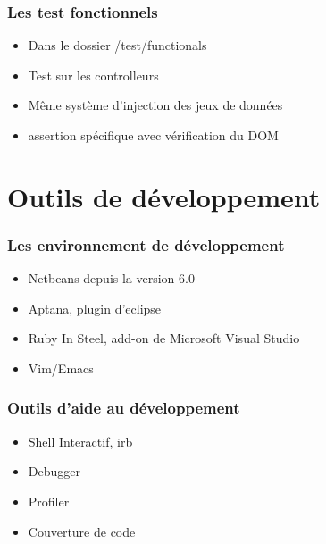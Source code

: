 \documentclass{beamer}
\begin{document}
\begin{frame}
    \frametitle{Les test fonctionnels}
    \begin{itemize}
        \item Dans le dossier /test/functionals
        \item Test sur les controlleurs
        \item Même système d'injection des jeux de données
        \item assertion spécifique avec vérification du DOM
    \end{itemize}
\end{frame}

\section{Outils de développement}

\begin{frame}
    \frametitle{Les environnement de développement}
    \begin{itemize}
        \item Netbeans depuis la version 6.0 
        \item Aptana, plugin d'eclipse
        \item Ruby In Steel, add-on de Microsoft Visual Studio
        \item Vim/Emacs
    \end{itemize}
\end{frame}

\begin{frame}
    \frametitle{Outils d'aide au développement}
    \begin{itemize}
        \item Shell Interactif, irb
        \item Debugger
        \item Profiler
        \item Couverture de code
    \end{itemize}
\end{frame}
\end{document}
